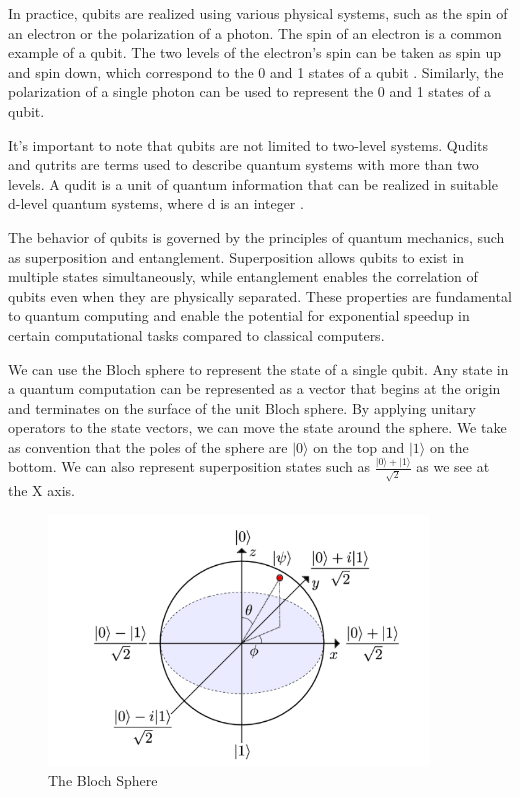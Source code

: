 \documentclass[inscr,ack,preface]{diphdthesis}
\begin{document}
In practice, \acrshort{qubit}s are realized using various physical systems, such as the spin of an electron or the polarization of a photon. The spin of an electron is a common example of a \acrshort{qubit}. The two levels of the electron's spin can be taken as spin up and spin down, which correspond to the 0 and 1 states of a \acrshort{qubit} \cite{electron}. Similarly, the polarization of a single photon can be used to represent the 0 and 1 states of a \acrshort{qubit}.

It's important to note that \acrshort{qubit}s are not limited to two-level systems. Qudits and qutrits are terms used to describe quantum systems with more than two levels. A qudit is a unit of quantum information that can be realized in suitable d-level quantum systems, where d is an integer \cite{qudit}.

The behavior of \acrshort{qubit}s is governed by the principles of quantum mechanics, such as superposition and entanglement. Superposition allows \acrshort{qubit}s to exist in multiple states simultaneously, while entanglement enables the correlation of \acrshort{qubit}s even when they are physically separated. These properties are fundamental to quantum computing and enable the potential for exponential speedup in certain computational tasks compared to classical computers.

We can use the Bloch sphere to represent the state of a single \acrshort{qubit}. Any
state in a quantum computation can be represented as a vector that begins at
the origin and terminates on the surface of the unit Bloch sphere. By applying
unitary operators to the state vectors, we can move the state around the sphere.
We take as convention that the poles of the sphere are $\vert0\rangle$ on the top and $\vert1\rangle$ on the bottom. \cite{hidary}
We can also represent superposition states such as 
\Large $\frac{\lvert 0 \rangle + \lvert 1 \rangle}{\sqrt{2}}$ 
\normalsize as we see at the X axis.
\begin{figure}[ht]
    \includegraphics[width=0.9\textwidth]{bloch.png}
    \caption{The Bloch Sphere}
    \label{fig:enter-label}
\end{figure}
\end{document}
